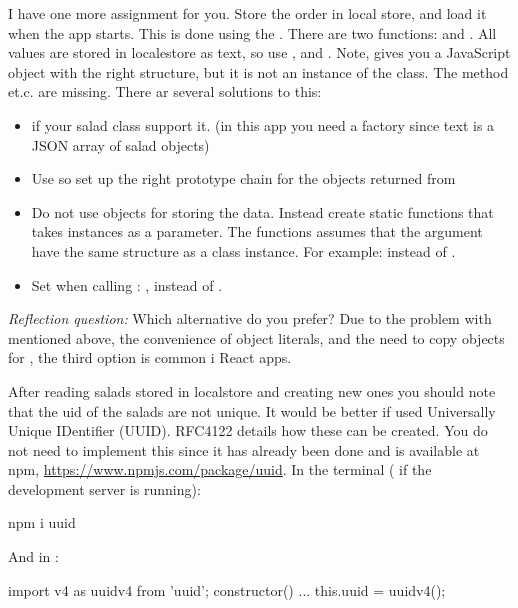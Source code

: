 \documentclass[fleqn, article, a4paper]{memoir}
\begin{document}
\begin{Assignments}
\item I have one more assignment for you. Store the order in local store, and load it when the app starts. This is done using the . There are two functions:  and . All values are stored in localestore as text, so use , and . Note,  gives you a JavaScript object with the right structure, but it is not an instance of the  class. The  method et.c. are missing. There ar several solutions to this:
\begin{itemize}
\item {} if your salad class support it. (in this app you need a factory since text is a JSON array of salad objects)
\item Use  so set up the right prototype chain for the objects returned from 
\item Do not use  objects for storing the data. Instead create static functions that takes  instances as a parameter. The functions assumes that the argument have the same structure as a  class instance. For example:  instead of .
\item Set  when calling : , instead of .
\end{itemize}
\emph{Reflection question:} Which alternative do you prefer? Due to the problem with  mentioned above, the convenience of object literals, and the need to copy objects for , the third option is common i React apps. 

After reading salads stored in localstore and creating new ones you should note that the uid of the salads are not unique. It would be better if  used Universally Unique IDentifier (UUID). RFC4122 details how these can be created. You do not need to implement this since it has already been done and is available at npm, \url{https://www.npmjs.com/package/uuid}. In the terminal ( if the development server is running):
\begin{Code}
npm i uuid
\end{Code}
\noindent And in :
\begin{Code}
import { v4 as uuidv4 } from 'uuid';
constructor(){ 
  ...
  this.uuid = uuidv4();
}
\end{Code}

\end{Assignments}

\end{document}
